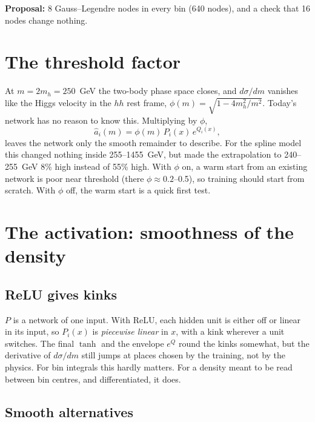 \documentclass[11pt]{article}
\begin{document}
\textbf{Proposal:} 8 Gauss--Legendre nodes in every bin (640 nodes), and a check that 16 nodes
change nothing.

\section{The threshold factor}
\label{sec:threshold}

At $m = 2m_h = 250$~GeV the two-body phase space closes, and $d\sigma/dm$ vanishes like the Higgs
velocity in the $hh$ rest frame, $\phi(m) = \sqrt{1-4m_h^2/m^2}$. Today's network has no reason
to know this. Multiplying by $\phi$,
\begin{equation}
  \hat a_i(m) = \phi(m)\,P_i(x)\,e^{Q_i(x)},
\end{equation}
leaves the network only the smooth remainder to describe. For the spline model this changed
nothing inside 255--1455~GeV, but made the extrapolation to 240--255~GeV 8\% high instead of
55\% high. With $\phi$ on, a warm start from an existing network is poor near threshold (there
$\phi \approx 0.2$--0.5), so training should start from scratch. With $\phi$ off, the warm start
is a quick first test.

\section{The activation: smoothness of the density}
\label{sec:activation}

\subsection{ReLU gives kinks}

$P$ is a network of one input. With ReLU, each hidden unit is either off or linear in its input,
so $P_i(x)$ is \emph{piecewise linear} in $x$, with a kink wherever a unit switches. The final
$\tanh$ and the envelope $e^{Q}$ round the kinks somewhat, but the derivative of $d\sigma/dm$
still jumps at places chosen by the training, not by the physics. For bin integrals this hardly
matters. For a density meant to be read between bin centres, and differentiated, it does.

\subsection{Smooth alternatives}
\end{document}
